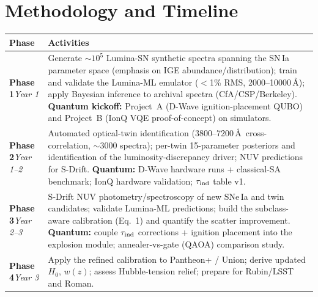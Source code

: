\documentclass[11pt]{article}
\begin{document}
\section{Methodology and Timeline}
\begin{center}\small
\begin{tabular}{@{}>{\raggedright\arraybackslash}p{2.05cm} >{\raggedright\arraybackslash}p{13.0cm}@{}}
\toprule
\textbf{\color{inkblue}Phase} & \textbf{\color{inkblue}Activities} \\
\midrule
\textbf{Phase 1}\newline\textit{Year 1} &
Generate $\sim$$10^5$ Lumina-SN synthetic spectra spanning the SN\,Ia parameter space (emphasis on
IGE abundance/distribution); train and validate the Lumina-ML emulator ($<$1\% RMS, 2000--10000\,\AA);
apply Bayesian inference to archival spectra (CfA/CSP/Berkeley). \textbf{Quantum kickoff:} Project~A
(D-Wave ignition-placement QUBO) and Project~B (IonQ VQE proof-of-concept) on simulators. \\
\textbf{Phase 2}\newline\textit{Year 1--2} &
Automated optical-twin identification (3800--7200\,\AA\ cross-correlation, $\sim$3000 spectra);
per-twin 15-parameter posteriors and identification of the luminosity-discrepancy driver; NUV
predictions for S-Drift. \textbf{Quantum:} D-Wave hardware runs + classical-SA benchmark; IonQ
hardware validation; $\tau_{\rm ind}$ table v1. \\
\textbf{Phase 3}\newline\textit{Year 2--3} &
S-Drift NUV photometry/spectroscopy of new SNe\,Ia and twin candidates; validate Lumina-ML
predictions; build the subclass-aware calibration (Eq.~1) and quantify the scatter improvement.
\textbf{Quantum:} couple $\tau_{\rm ind}$ corrections + ignition placement into the explosion module;
annealer-vs-gate (QAOA) comparison study. \\
\textbf{Phase 4}\newline\textit{Year 3} &
Apply the refined calibration to Pantheon+ / Union; derive updated $H_0$, $w(z)$; assess Hubble-tension
relief; prepare for Rubin/LSST and Roman. \\
\bottomrule
\end{tabular}
\end{center}

\end{document}
